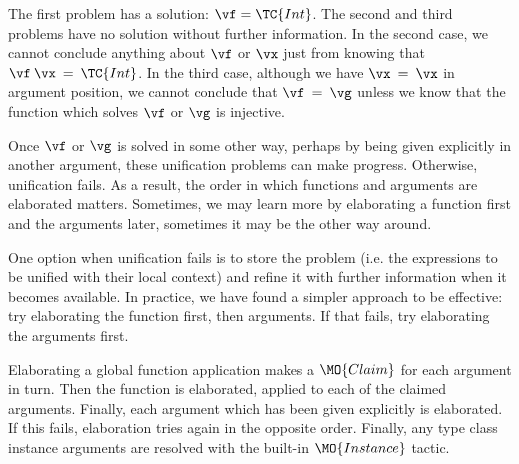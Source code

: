 
The first problem has a solution: $\vf=\TC{Int}$. The second and third problems have
no solution without further information. In the second case, we cannot conclude 
anything about $\vf$ or $\vx$ just from knowing that $\vf\:\vx\:=\:\TC{Int}$.
In the third case, although we have $\vx\:=\:\vx$ in argument position, we cannot
conclude that $\vf\:=\:\vg$ unless we know that the function which solves $\vf$ or
$\vg$ is injective.

Once $\vf$ or $\vg$ is solved in some other way, perhaps by being given explicitly
in another argument, these unification problems can make progress. Otherwise, unification
fails. As a result, the order in which functions and arguments are
elaborated matters. Sometimes, we may learn more by elaborating a function first
and the arguments later, sometimes it may be the other way around. 

One option when unification fails is to store the problem (i.e. the expressions to be
unified with their local context) and refine it with further information when it becomes 
available. In practice, we have found a simpler approach to be effective: try
elaborating the function first, then arguments. If that fails, try elaborating the
arguments first.

Elaborating a global function application makes a $\MO{Claim}$ for each argument
in turn. Then the function is elaborated, applied to each of the claimed arguments.
Finally, each argument which has been given explicitly is elaborated. If this fails,
elaboration tries again in the opposite order. Finally, any type
class instance arguments are resolved with the built-in $\MO{Instance}$ tactic.


